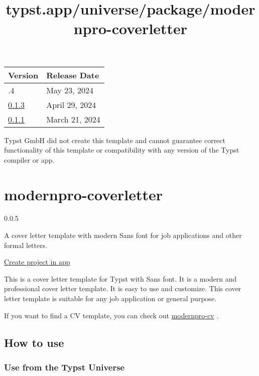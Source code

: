 \begin{longtable}[]{@{}ll@{}}
\toprule\noalign{}
Version & Release Date \\
\midrule\noalign{}
\endhead
\bottomrule\noalign{}
\endlastfoot
0.1.4 & May 23, 2024 \\
\href{https://typst.app/universe/package/mantys/0.1.3/}{0.1.3} & April
29, 2024 \\
\href{https://typst.app/universe/package/mantys/0.1.1/}{0.1.1} & March
21, 2024 \\
\end{longtable}

Typst GmbH did not create this template and cannot guarantee correct
functionality of this template or compatibility with any version of the
Typst compiler or app.


\title{typst.app/universe/package/modernpro-coverletter}

\label{banner}
\label{template-thumbnail}

\section{modernpro-coverletter}\label{modernpro-coverletter}

{ 0.0.5 }

A cover letter template with modern Sans font for job applications and
other formal letters.

\href{/app?template=modernpro-coverletter&version=0.0.5}{Create project
in app}

\label{readme}
This is a cover letter template for Typst with Sans font. It is a modern
and professional cover letter template. It is easy to use and customize.
This cover letter template is suitable for any job application or
general purpose.

If you want to find a CV template, you can check out
\href{https://github.com/jxpeng98/Typst-CV-Resume/blob/main/README.md}{modernpro-cv}
.

\subsection{How to use}\label{how-to-use}

\subsubsection{Use from the Typst
Universe}\label{use-from-the-typst-universe}


